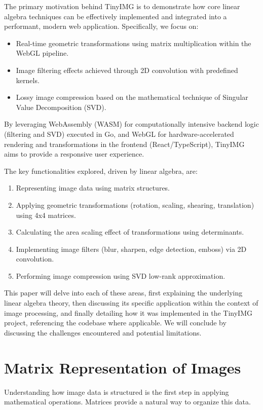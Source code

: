 \documentclass{article}
\begin{document}
The primary motivation behind TinyIMG is to demonstrate how core linear algebra techniques can be effectively implemented and integrated into a performant, modern web application. Specifically, we focus on:
\begin{itemize}
    \item Real-time geometric transformations using matrix multiplication within the WebGL pipeline.
    \item Image filtering effects achieved through 2D convolution with predefined kernels.
    \item Lossy image compression based on the mathematical technique of Singular Value Decomposition (SVD).
\end{itemize}
By leveraging WebAssembly (WASM) for computationally intensive backend logic (filtering and SVD) executed in Go, and WebGL for hardware-accelerated rendering and transformations in the frontend (React/TypeScript), TinyIMG aims to provide a responsive user experience.

The key functionalities explored, driven by linear algebra, are:
\begin{enumerate}
    \item Representing image data using matrix structures.
    \item Applying geometric transformations (rotation, scaling, shearing, translation) using 4x4 matrices.
    \item Calculating the area scaling effect of transformations using determinants.
    \item Implementing image filters (blur, sharpen, edge detection, emboss) via 2D convolution.
    \item Performing image compression using SVD low-rank approximation.
\end{enumerate}

This paper will delve into each of these areas, first explaining the underlying linear algebra theory, then discussing its specific application within the context of image processing, and finally detailing how it was implemented in the TinyIMG project, referencing the codebase where applicable. We will conclude by discussing the challenges encountered and potential limitations.

\section{Matrix Representation of Images}
\label{sec:representation}
Understanding how image data is structured is the first step in applying mathematical operations. Matrices provide a natural way to organize this data.
\end{document}
